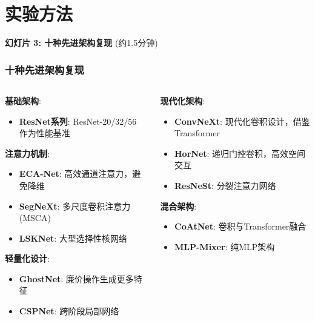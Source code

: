 \documentclass[10pt]{beamer}
\begin{document}
\section{实验方法}
\begin{frame}{\textbf{幻灯片 3: 十种先进架构复现} (约1.5分钟)}
\frametitle{十种先进架构复现}

{\small
\begin{columns}[T]
    \begin{column}{0.5\textwidth}
        \textbf{基础架构}:
        \begin{itemize}
            \item \textbf{ResNet系列}: ResNet-20/32/56 作为性能基准
        \end{itemize}
        
        \textbf{注意力机制}:
        \begin{itemize}
            \item \textbf{ECA-Net}: 高效通道注意力，避免降维 \cite{Wang_2020_CVPR}
            \item \textbf{SegNeXt}: 多尺度卷积注意力 (MSCA) \cite{Guo2022SegNeXt}
            \item \textbf{LSKNet}: 大型选择性核网络 \cite{Li2023Large}
        \end{itemize}
        
        \textbf{轻量化设计}:
        \begin{itemize}
            \item \textbf{GhostNet}: 廉价操作生成更多特征 \cite{Han2020GhostNet}
            \item \textbf{CSPNet}: 跨阶段局部网络 \cite{Wang2020CSPNet}
        \end{itemize}
    \end{column}
    \begin{column}{0.5\textwidth}
        \textbf{现代化架构}:
        \begin{itemize}
            \item \textbf{ConvNeXt}: 现代化卷积设计，借鉴Transformer \cite{Liu2022ConvNet}
            \item \textbf{HorNet}: 递归门控卷积，高效空间交互 \cite{Rao2022HorNet}
            \item \textbf{ResNeSt}: 分裂注意力网络 \cite{Zhang2022ResNeSt}
        \end{itemize}
        
        \textbf{混合架构}:
        \begin{itemize}
            \item \textbf{CoAtNet}: 卷积与Transformer融合 \cite{Dai2021CoAtNet}
            \item \textbf{MLP-Mixer}: 纯MLP架构 \cite{Tolstikhin2021MLPMixer}
        \end{itemize}
        

\end{column}
\end{columns}}
\end{frame}
\end{document}

